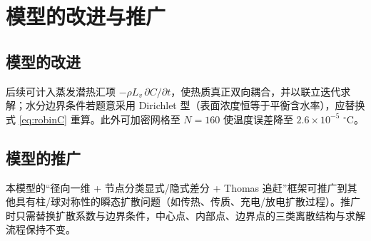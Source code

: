 \section{模型的改进与推广}

\subsection{模型的改进}
后续可计入蒸发潜热汇项 $-\rho L_v\,\partial C/\partial t$，使热质真正双向耦合，并以联立迭代求解；水分边界条件若题意采用 Dirichlet 型（表面浓度恒等于平衡含水率），应替换式 \eqref{eq:robinC} 重算。此外可加密网格至 $N=160$ 使温度误差降至 $2.6\times10^{-5}$ $^\circ$C。

\subsection{模型的推广}
本模型的“径向一维 + 节点分类显式/隐式差分 + Thomas 追赶”框架可推广到其他具有柱/球对称性的瞬态扩散问题（如传热、传质、充电/放电扩散过程）。推广时只需替换扩散系数与边界条件，中心点、内部点、边界点的三类离散结构与求解流程保持不变。
